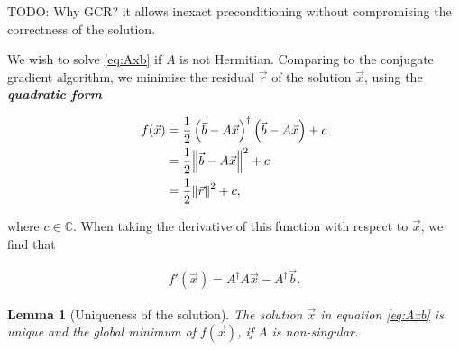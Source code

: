 \documentclass{article}
\theoremstyle{plain} %
\newtheorem{lemma}[theorem]{Lemma}
\theoremstyle{convention} %
\theoremstyle{remark} %
\def\df#1{\textbf{\textit{#1}}}
\numberwithin{equation}{section}
\begin{document}
TODO: Why GCR? it allows inexact preconditioning without compromising the correctness of the solution.

We wish to solve \eqref{eq:Axb} if $A$ is not Hermitian. Comparing to the conjugate gradient algorithm, we minimise the residual $\vec{r}$ of the solution $\vec{x}$, using the \df{quadratic form}

\begin{align*}
    f(\vec{x}) &= \frac{1}{2} \left( \vec{b} - A \vec{x} \right)^{\dagger} \left( \vec{b} - A \vec{x} \right) + c \\
               &= \frac{1}{2} \norm{ \vec{b} - A \vec{x} }^2 + c\\
               &= \frac{1}{2} \norm{ \vec{r} }^2 + c,
\end{align*}

where $c \in \mathbb{C}$. When taking the derivative of this function with respect to $\vec{x}$, we find that

\begin{align*}
    f'(\vec{x}) = A^{\dagger} A \vec{x} - A^{\dagger} \vec{b}.
\end{align*}

\begin{lemma}[Uniqueness of the solution]
The solution $\vec{x}$ in equation \eqref{eq:Axb} is unique and the global minimum of $f(\vec{x})$, if $A$ is non-singular.
\end{lemma}
\end{document}
